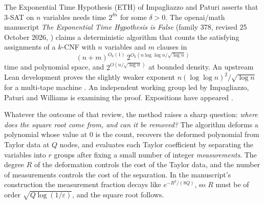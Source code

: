 \documentclass[11pt]{article}
\theoremstyle{definition}
\theoremstyle{remark}
\begin{document}
The Exponential Time Hypothesis (ETH) of Impagliazzo and Paturi asserts that 3-SAT on $n$ variables needs time $2^{\delta n}$ for some $\delta>0$. The openai/math manuscript \emph{The Exponential Time Hypothesis is False} (family 378, revised 25 October 2026, \cite{oai378}) claims a deterministic algorithm that counts the satisfying assignments of a $k$-CNF with $n$ variables and $m$ clauses in
\[
(n+m)^{O_k(1)}\,2^{O_k(n\log\log n/\sqrt{\log n})}
\]
time and polynomial space, and $2^{O(n/\sqrt{\log n})}$ at bounded density. An upstream Lean development proves the slightly weaker exponent $n(\log\log n)^2/\sqrt{\log n}$ for a multi-tape machine \cite{oai378lean}. An independent working group led by Impagliazzo, Paturi and Williams is examining the proof. Expositions have appeared \cite{odonnell,kintali}.

Whatever the outcome of that review, the method raises a sharp question: \emph{where does the square root come from, and can it be removed?} The algorithm deforms a polynomial whose value at $0$ is the count, recovers the deformed polynomial from Taylor data at $Q$ nodes, and evaluates each Taylor coefficient by separating the variables into $r$ groups after fixing a small number of integer \emph{measurements}. The degree $R$ of the deformation controls the cost of the Taylor data, and the number of measurements controls the cost of the separation. In the manuscript's construction the measurement fraction decays like $e^{-R^2/(8Q)}$, so $R$ must be of order $\sqrt{Q\log(1/\varepsilon)}$, and the square root follows.
\end{document}
